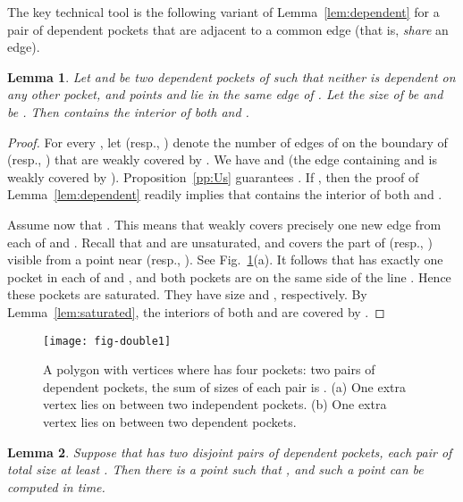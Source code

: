 \documentclass[12pt]{article}
\newtheorem{lemma}{Lemma}
\begin{document}
The key technical tool is the following variant of Lemma~\ref{lem:dependent} for
a pair of dependent pockets that are adjacent to a common edge (that is, \emph{share} an edge).

\begin{lemma}\label{lem:double}
Let  and  be two dependent pockets of  such that neither is dependent on any other pocket, and points  and  lie in the same edge of . Let the size of  be  and  be .
Then  contains the interior of both  and .
\end{lemma}

\begin{proof}
For every , let  (resp., ) denote the number of edges of  on the boundary of  (resp., ) that are weakly covered by . We have  and  (the edge containing  and  is weakly covered by ). Proposition~\ref{pp:Us} guarantees . If , then the proof of Lemma~\ref{lem:dependent} readily implies that  contains the interior of both  and .

Assume now that . This means that  weakly covers precisely one new edge from each of  and . Recall that  and  are unsaturated, and  covers the part of  (resp., ) visible from a point near  (resp., ). See Fig.~\ref{fig:double1}(a). It follows that 
has exactly one pocket in each of  and , and both pockets are on the same
side of the line . Hence these pockets are saturated. They have size  and , respectively.
By Lemma~\ref{lem:saturated}, the interiors of both  and  are covered by .
\end{proof}

\begin{figure}[htp]
  \centering
  \texttt{[image: fig-double1]}
  \caption{\label{fig:double1}
A polygon  with  vertices where  has four pockets: two pairs of dependent pockets, the
sum of sizes of each pair is .
(a) One extra vertex lies on  between two independent pockets.
(b) One extra vertex lies on  between two dependent pockets.}
\end{figure}

\begin{lemma}\label{lem:violate1}
Suppose that  has two disjoint pairs of dependent pockets, each
pair of total size at least . Then there is a point  such that
, and such a point  can be computed in  time.
\end{lemma}
\end{document}
